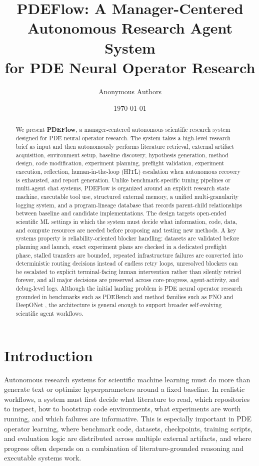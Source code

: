 \documentclass[11pt]{article}
\title{PDEFlow: A Manager-Centered Autonomous Research Agent System\\for PDE Neural Operator Research}
\author{Anonymous Authors}
\date{\today}
\begin{document}
\maketitle

\begin{abstract}
We present \textbf{PDEFlow}, a manager-centered autonomous scientific research system designed for PDE neural operator research. The system takes a high-level research brief as input and then autonomously performs literature retrieval, external artifact acquisition, environment setup, baseline discovery, hypothesis generation, method design, code modification, experiment planning, preflight validation, experiment execution, reflection, human-in-the-loop (HITL) escalation when autonomous recovery is exhausted, and report generation. Unlike benchmark-specific tuning pipelines or multi-agent chat systems, PDEFlow is organized around an explicit research state machine, executable tool use, structured external memory, a unified multi-granularity logging system, and a program-lineage database that records parent-child relationships between baseline and candidate implementations. The design targets open-ended scientific ML settings in which the system must decide what information, code, data, and compute resources are needed before proposing and testing new methods. A key systems property is reliability-oriented blocker handling: datasets are validated before planning and launch, exact experiment plans are checked in a dedicated preflight phase, stalled transfers are bounded, repeated infrastructure failures are converted into deterministic routing decisions instead of endless retry loops, unresolved blockers can be escalated to explicit terminal-facing human intervention rather than silently retried forever, and all major decisions are preserved across core-progress, agent-activity, and debug-level logs. Although the initial landing problem is PDE neural operator research grounded in benchmarks such as PDEBench \cite{takamoto2022pdebench} and method families such as FNO \cite{li2020fno} and DeepONet \cite{lu2021deeponet}, the architecture is general enough to support broader self-evolving scientific agent workflows.
\end{abstract}

\section{Introduction}
Autonomous research systems for scientific machine learning must do more than generate text or optimize hyperparameters around a fixed baseline. In realistic workflows, a system must first decide what literature to read, which repositories to inspect, how to bootstrap code environments, what experiments are worth running, and which failures are informative. This is especially important in PDE operator learning, where benchmark code, datasets, checkpoints, training scripts, and evaluation logic are distributed across multiple external artifacts, and where progress often depends on a combination of literature-grounded reasoning and executable systems work.
\end{document}
